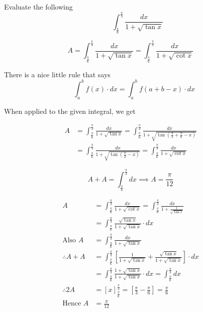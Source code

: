 \documentclass[14pt,fleqn]{extarticle}
\begin{document}
\newcommand\ea{1 + \sqrt{\tan x}}
\newcommand\eb{1 + \sqrt{\cot x}}
\newcommand\ec{\frac{\sqrt{\tan x}}{\ea}}
\newcommand\intg{\int_{\frac\pi{6}}^{\frac\pi{3}}}
\newcommand\etan{\sqrt{\tan x}}

Evaluate the following \[\qquad \int_\frac{\pi}{6}^\frac{\pi}{3}\dfrac{dx}{1+\sqrt{\tan x}}\]

\newcard

\[ A = \intg \frac{dx}{\ea} = \intg \frac{dx}{\eb}\]

\newcard 

There is a nice little rule that says 
\[ \quad \int_a^b f(x)\cdot dx = \int_a^b f \left(a+b-x \right)\cdot dx \] 

When applied to the given integral, we get 

\begin{align}
	A &= \intg \frac{dx}{\ea} = \intg \frac{dx}{1+\sqrt{\tan \left( \frac\pi{3}+\frac\pi{6} - x\right)}} \\
	&= \intg \frac{dx}{1 + \sqrt{\tan \left(\frac\pi{2} - x \right)}} = \intg \frac{dx}{1+\sqrt{\cot x}}
\end{align}

\newcard 

\[ A + A = \intg dx \implies A = \frac{\pi}{12}\]

\newcard 

\begin{align}
	A &= \intg \frac{dx}{\eb} = \intg \frac{dx}{1 + \frac{1}{\sqrt{\tan x}}} \\
	&= \intg \frac{\sqrt{\tan{x}}}{1+ \sqrt{\tan x}}\cdot dx  \\
	\text{Also } A &= \intg \frac{dx}{\ea} \\
	\therefore A + A &= \intg \left[ \frac{1}{1 + \etan} + \frac{\etan}{1 + \etan}\right]\cdot dx \\
	&= \intg \frac{1 + \etan}{1+\etan}\cdot dx = \intg dx \\
	\therefore 2A &= \left[x \right]_{\frac\pi{6}}^{\frac\pi{3}} = \left[\frac\pi{3} - \frac\pi{6} \right] = \frac\pi{6} \\
	\text{Hence } A &= \frac\pi{12}
\end{align}
\end{document}
